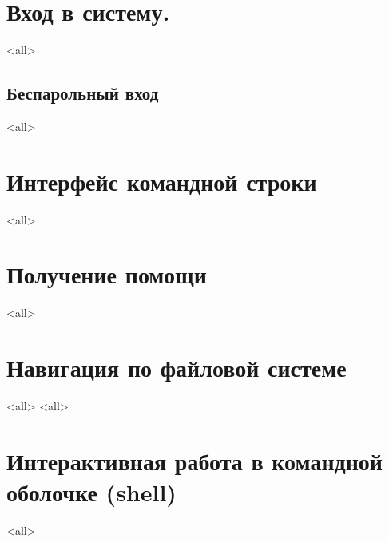 \section{Вход в систему.}
\mode<all>{}
\subsection{Беспарольный вход}
\mode<all>{}

\section{Интерфейс командной строки}
\mode<all>{}

\section{Получение помощи}
\mode<all>{}


\section{Навигация по файловой системе}
\mode<all>{}
\mode<all>{}

\section{Интерактивная работа в командной оболочке (shell)}
\mode<all>{}



